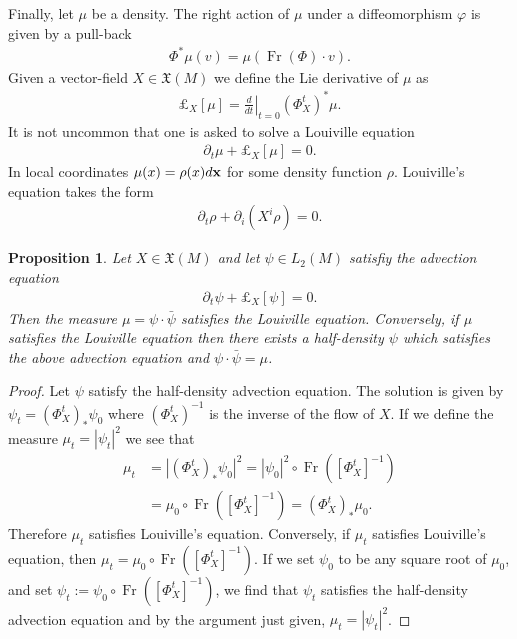 \documentclass[12pt]{amsart}
\newtheorem{prop}{Proposition}
\DeclareMathOperator{\Fr}{Fr}
\begin{document}
Finally, let $\mu$ be a density.  The right action of $\mu$ under a diffeomorphism $\varphi$ is given by a pull-back
\begin{align*}
  \Phi^* \mu (v) = \mu ( \Fr(\Phi) \cdot v).
\end{align*}
Given a vector-field $X \in \mathfrak{X}(M)$ we define the Lie derivative
of $\mu$ as
\begin{align*}
  \pounds_X[ \mu] = \left. \frac{d}{dt} \right|_{t=0} (\Phi_X^t)^* \mu.
\end{align*}
It is not uncommon that one is asked to solve a Louiville equation
\begin{align*}
  \partial_t \mu + \pounds_X[\mu] = 0.
\end{align*}
In local coordinates $\mu(x) = \rho(x) d {\bf x}$ for some density function $\rho$.  Louiville's equation takes the form
\begin{align*}
  \partial_t \rho + \partial_i ( X^i \rho) = 0.
\end{align*}
\begin{prop}
  Let $X \in \mathfrak{X}(M)$ and let $\psi \in L_2(M)$ satisfiy the advection equation
  \begin{align*}
    \partial_t \psi + \pounds_X[\psi] = 0.
  \end{align*}
  Then the measure $\mu = \psi \cdot \bar{\psi}$ satisfies the Louiville equation.  Conversely, if $\mu$ satisfies the Louiville equation then there exists a half-density $\psi$ which satisfies the above advection equation and $\psi \cdot \bar{\psi} = \mu$.
\end{prop}
\begin{proof}
  Let $\psi$ satisfy the half-density advection equation.
  The solution is given by $\psi_t = (\Phi_X^t)_*\psi_0$
  where $(\Phi_X^{t})^{-1}$ is the inverse of the flow of $X$.
  If we define the measure $\mu_t = |\psi_t |^2$
  we see that
  \begin{align*}
    \mu_t &= | (\Phi_X^t)_* \psi_0 |^2 = | \psi_0 |^2 \circ \Fr([\Phi_X^t]^{-1}) \\
    &= \mu_0 \circ \Fr( [\Phi_X^t]^{-1}) = (\Phi_X^{t})_* \mu_0.
  \end{align*}
  Therefore $\mu_t$ satisfies Louiville's equation.
  Conversely, if $\mu_t$ satisfies Louiville's equation,
  then $\mu_t = \mu_0 \circ \Fr([\Phi_X^t]^{-1})$.
  If we set $\psi_0$ to be any square root of $\mu_0$,
  and set $\psi_t := \psi_0 \circ \Fr([\Phi_X^t]^{-1})$, we find
  that $\psi_t$ satisfies the half-density advection equation
  and by the argument just given, $\mu_t = |\psi_t|^2$.
\end{proof}
\end{document}
